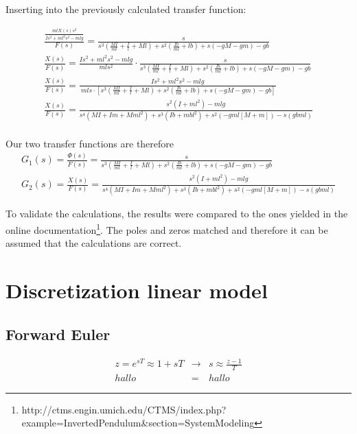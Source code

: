 Inserting into the previously calculated transfer function:

\begin{eqnarray}
	\frac{\frac{mlX\left(s\right)s^2}{Is^2+ml^2s^2-mlg}}{F\left(s\right)}=\frac{s}{s^3\left(\frac{MI}{ml}+\frac{I}{l}+Ml\right)+s^2\left(\frac{Ib}{ml}+lb\right)+s(-gM-gm)-gb}
	\\
	\frac{X\left(s\right)}{F\left(s\right)}=\frac{Is^2+ml^2s^2-mlg}{mls^2}\cdot\frac{s}{s^3\left(\frac{MI}{ml}+\frac{I}{l}+Ml\right)+s^2\left(\frac{Ib}{ml}+lb\right)+s(-gM-gm)-gb}
	\\
	\frac{X\left(s\right)}{F\left(s\right)}=\frac{Is^2+ml^2s^2-mlg}{\ mls\cdot\left[s^3\left(\frac{MI}{ml}+\frac{I}{l}+Ml\right)+s^2\left(\frac{Ib}{ml}+lb\right)+s\left(-gM-gm\right)-gb\right]}
	\\
	\frac{X\left(s\right)}{F\left(s\right)}=\frac{s^2\left(I+ml^2\right)-mlg}{s^4\left(MI+Im+Mml^2\right)+s^3\left(Ib+m{bl}^2\right)+s^2\left(-gml\left[M+m\right]\right)-s\left(gbml\right)}
	\\
\end{eqnarray}

Our two transfer functions are therefore
\begin{eqnarray}
	G_1\left(s\right)=\frac{\Phi\left(s\right)}{F\left(s\right)}=\frac{s}{s^3\left(\frac{MI}{ml}+\frac{I}{l}+Ml\right)+s^2\left(\frac{Ib}{ml}+lb\right)+s(-gM-gm)-gb}
	\\
	G_2\left(s\right)=\frac{X\left(s\right)}{F\left(s\right)}=\frac{s^2\left(I+ml^2\right)-mlg}{s^4\left(MI+Im+Mml^2\right)+s^3\left(Ib+m{bl}^2\right)+s^2\left(-gml\left[M+m\right]\right)-s\left(gbml\right)}
\end{eqnarray}

To validate the calculations, the results were compared to the ones yielded in the online documentation\footnote{http://ctms.engin.umich.edu/CTMS/index.php?example=InvertedPendulum\&section=SystemModeling}.  The poles and zeros matched and therefore it can be assumed that the calculations are correct.

\section{Discretization linear model}

	\subsection{Forward Euler}
	
		\begin{eqnarray}
			z = e^{sT} \approx 1 + sT &\rightarrow& s \approx \frac{z - 1}{T}\\
			hallo &=& hallo
		\end{eqnarray}
	
